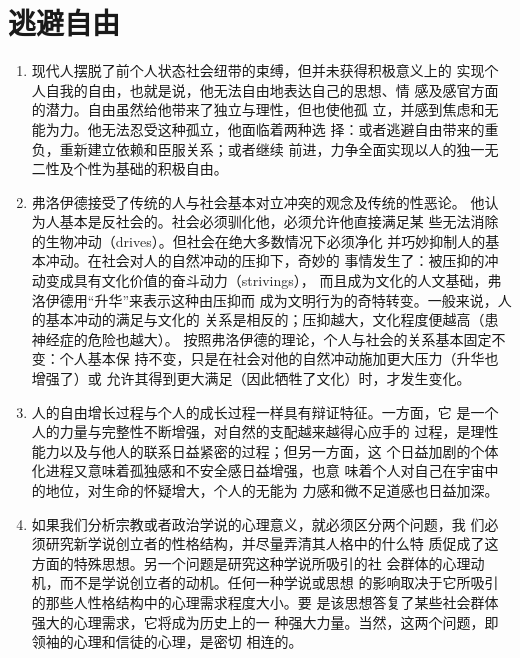 \documentclass[UTF8]{ctexart}
\begin{document}
	\newpage
	
	\section{逃避自由}
	
	
		\begin{enumerate}
	
			\item 现代人摆脱了前个人状态社会纽带的束缚，但并未获得积极意义上的
			实现个人自我的自由，也就是说，他无法自由地表达自己的思想、情
			感及感官方面的潜力。自由虽然给他带来了独立与理性，但也使他孤
			立，并感到焦虑和无能为力。他无法忍受这种孤立，他面临着两种选
			择：或者逃避自由带来的重负，重新建立依赖和臣服关系；或者继续
			前进，力争全面实现以人的独一无二性及个性为基础的积极自由。
			
			\item 弗洛伊德接受了传统的人与社会基本对立冲突的观念及传统的性恶论。
			他认为人基本是反社会的。社会必须驯化他，必须允许他直接满足某
			些无法消除的生物冲动（drives）。但社会在绝大多数情况下必须净化
			并巧妙抑制人的基本冲动。在社会对人的自然冲动的压抑下，奇妙的
			事情发生了：被压抑的冲动变成具有文化价值的奋斗动力（strivings），
			而且成为文化的人文基础，弗洛伊德用“升华”来表示这种由压抑而
			成为文明行为的奇特转变。一般来说，人的基本冲动的满足与文化的
			关系是相反的；压抑越大，文化程度便越高（患神经症的危险也越大）。
			按照弗洛伊德的理论，个人与社会的关系基本固定不变：个人基本保
			持不变，只是在社会对他的自然冲动施加更大压力（升华也增强了）或
			允许其得到更大满足（因此牺牲了文化）时，才发生变化。
			
			\item 人的自由增长过程与个人的成长过程一样具有辩证特征。一方面，它
			是一个人的力量与完整性不断增强，对自然的支配越来越得心应手的
			过程，是理性能力以及与他人的联系日益紧密的过程；但另一方面，这
			个日益加剧的个体化进程又意味着孤独感和不安全感日益增强，也意
			味着个人对自己在宇宙中的地位，对生命的怀疑增大，个人的无能为
			力感和微不足道感也日益加深。
	
			\item 如果我们分析宗教或者政治学说的心理意义，就必须区分两个问题，我
			们必须研究新学说创立者的性格结构，并尽量弄清其人格中的什么特
			质促成了这方面的特殊思想。另一个问题是研究这种学说所吸引的社
			会群体的心理动机，而不是学说创立者的动机。任何一种学说或思想
			的影响取决于它所吸引的那些人性格结构中的心理需求程度大小。要
			是该思想答复了某些社会群体强大的心理需求，它将成为历史上的一
			种强大力量。当然，这两个问题，即领袖的心理和信徒的心理，是密切
			相连的。
			

\end{enumerate}
\end{document}
